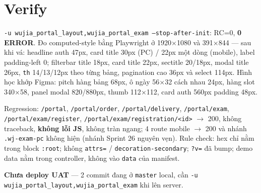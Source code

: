 \section{Verify}

\texttt{-u wujia\_portal\_layout,wujia\_portal\_exam --stop-after-init}: RC=0, \textbf{0 ERROR}.
Đo computed-style bằng Playwright ở 1920$\times$1080 và 391$\times$844 --- sau khi vá:
headline auth 47px, card title 30px (PC) / 22px một dòng (mobile), label padding-left 0;
filterbar title 18px, card title 22px, sectitle 20/18px, modal title 26px, \texttt{th} 14/13/12px theo
từng bảng, pagination cao 36px và select 114px. Hình học khớp Figma: pitch hàng bảng 68px, ô ngày
56$\times$32 cách nhau 24px, hàng slot 340$\times$58, panel modal 820/880px, thumb 112$\times$112,
card auth 560px padding 48px.

Regression: \texttt{/portal}, \texttt{/portal/order}, \texttt{/portal/delivery}, \texttt{/portal/exam},
\texttt{/portal/exam/register}, \texttt{/portal/exam/registration/<id>} $\to$ 200, không traceback,
\textbf{không lỗi JS}, không tràn ngang; 4 route mobile $\to$ 200 và nhánh \texttt{.wj-exam-pc} không hiện
(nhánh Sprint 26 nguyên vẹn). Rule check: hex chỉ nằm trong block \texttt{:root}; không \texttt{attrs=} /
\texttt{decoration-secondary}; \texttt{?v=} đã bump; demo data nằm trong controller, không vào \texttt{data}
của manifest.

\textbf{Chưa deploy UAT} --- 2 commit đang ở \texttt{master} local, cần \texttt{-u wujia\_portal\_layout,wujia\_portal\_exam}
khi lên server.
